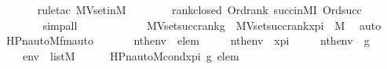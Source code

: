 \begin{isabellebody}
\ \ \ \ \ \isamarkupfalse%
\ {\isacharparenleft}{\kern0pt}rule{\isacharunderscore}{\kern0pt}tac\ MVset{\isacharunderscore}{\kern0pt}in{\isacharunderscore}{\kern0pt}M{\isacharparenright}{\kern0pt}\ \isanewline
\ \ \ \ \ \isamarkupfalse%
\ rank{\isacharunderscore}{\kern0pt}closed\ Ord{\isacharunderscore}{\kern0pt}rank\ succ{\isacharunderscore}{\kern0pt}in{\isacharunderscore}{\kern0pt}MI\ Ord{\isacharunderscore}{\kern0pt}succ\ \isanewline
\ \ \ \ \ \ \isamarkupfalse%
\ simp{\isacharunderscore}{\kern0pt}all\isanewline
\ \ \ \ \ \isamarkupfalse%
\isanewline
\ \ \ \isamarkupfalse%
\ \isamarkupfalse%
\ {\isachardoublequoteopen}{\isacharparenleft}{\kern0pt}MVset{\isacharparenleft}{\kern0pt}succ{\isacharparenleft}{\kern0pt}rank{\isacharparenleft}{\kern0pt}g{\isacharparenright}{\kern0pt}{\isacharparenright}{\kern0pt}{\isacharparenright}{\kern0pt}\ {\isasymtimes}\ MVset{\isacharparenleft}{\kern0pt}succ{\isacharparenleft}{\kern0pt}rank{\isacharparenleft}{\kern0pt}x{\isacharunderscore}{\kern0pt}pi{\isacharparenright}{\kern0pt}{\isacharparenright}{\kern0pt}{\isacharparenright}{\kern0pt}{\isacharparenright}{\kern0pt}\ {\isasymin}\ M{\isachardoublequoteclose}\ \isamarkupfalse%
\ auto\isanewline
\ \isamarkupfalse%
%
\endisatagproof
{\isafoldproof}%
%
\isadelimproof
\isanewline
%
\endisadelimproof
\isanewline
{}\isamarkupfalse%
\ HPn{\isacharunderscore}{\kern0pt}auto{\isacharunderscore}{\kern0pt}M{\isacharunderscore}{\kern0pt}fm{\isacharunderscore}{\kern0pt}auto{\isacharcolon}{\kern0pt}\isanewline
\ \ \isanewline
\ \ \ \ {\isachardoublequoteopen}nth{\isacharparenleft}{\kern0pt}{}{\isacharcomma}{\kern0pt}env{\isacharparenright}{\kern0pt}\ {\isacharequal}{\kern0pt}\ elem{\isachardoublequoteclose}\ \isanewline
\ \ \ \ {\isachardoublequoteopen}nth{\isacharparenleft}{\kern0pt}{}{\isacharcomma}{\kern0pt}env{\isacharparenright}{\kern0pt}\ {\isacharequal}{\kern0pt}\ x{\isacharunderscore}{\kern0pt}pi{\isachardoublequoteclose}\ \isanewline
\ \ \ \ {\isachardoublequoteopen}nth{\isacharparenleft}{\kern0pt}{}{\isacharcomma}{\kern0pt}env{\isacharparenright}{\kern0pt}\ {\isacharequal}{\kern0pt}\ g{\isachardoublequoteclose}\ \ \isanewline
\ \ \ \ {\isachardoublequoteopen}env\ {\isasymin}\ list{\isacharparenleft}{\kern0pt}M{\isacharparenright}{\kern0pt}{\isachardoublequoteclose}\isanewline
\ \isanewline
\ \ \ \ {\isachardoublequoteopen}HPn{\isacharunderscore}{\kern0pt}auto{\isacharunderscore}{\kern0pt}M{\isacharunderscore}{\kern0pt}cond{\isacharparenleft}{\kern0pt}x{\isacharunderscore}{\kern0pt}pi{\isacharcomma}{\kern0pt}\ g{\isacharcomma}{\kern0pt}\ elem{\isacharparenright}{\kern0pt}\isanewline

\end{isabellebody}
